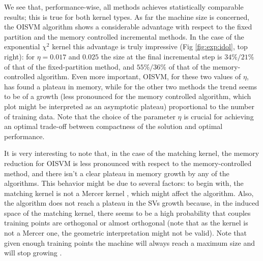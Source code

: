 We see that, performance-wise, all methods achieves statistically
comparable results; this is true for both kernel types. As far the
machine size is concerned, the OISVM algorithm shows a considerable
advantage with respect to the fixed partition and the memory
controlled incremental methods. In the case of the exponential
$\chi^{2}$ kernel this advantage is truly impressive (Fig
\ref{fig:exp:idol}, top right): for $\eta=0.017$ and $0.025$ the
size at the final incremental step is $34\%/21\%$ of that of the
fixed-partition method, and $55\%/36\%$ of that of the
memory-controlled algorithm. Even more important, OISVM, for these two
values of $\eta$, has found a plateau in memory, while for the other
two methods the trend seems to be of a growth (less pronounced for the
memory controlled algorithm, which plot might be interpreted as an
asymptotic plateau) proportional to the number of training data. Note
that the choice of the parameter $\eta$ is crucial for achieving an
optimal trade-off between compactness of the solution and optimal
performance.

It is very interesting to note that, in the case of the matching
kernel, the memory reduction for OISVM is less pronounced with respect
to the memory-controlled method, and there isn't a clear plateau in
memory growth by any of the algorithms.  This behavior might be due to
several factors: to begin with, the matching kernel is not a Mercer
kernel \cite{fleuret:bmvc04}, which might affect the algorithm. Also,
the algorithm does not reach a plateau in the SVs growth because, in
the induced space of the matching kernel, there seems to be a high
probability that couples training points are orthogonal or almost
orthogonal (note that as the kernel is not a Mercer one, the geometric
interpretation might not be valid). Note that given enough training
points the machine will always reach a maximum size and will stop
growing \cite{engel2004}.

